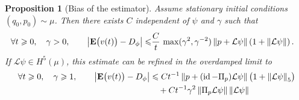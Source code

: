 \documentclass[11pt,a4paper]{article}
\DeclareMathOperator{\id}{id}
\newcommand{\expect}[0]{\mathbf{E}}
\theoremstyle{plain}
\newtheorem{proposition}{Proposition}[section]
\numberwithin{equation}{section}
\renewcommand{\leq}{\leqslant}
\renewcommand{\geq}{\geqslant}
\begin{document}
\begin{proposition}
    [Bias of the estimator]
    Assume stationary initial conditions~$(q_0, p_0) \sim \mu$.
    Then there exists $C$ independent of $\psi$ and $\gamma$ such that
    \begin{align}
        \label{eq:basic_bound_bias}
        \forall t \geq 0, \quad \gamma > 0, \qquad
        \abs{\expect \bigl( v(t) \bigr) - D_{\phi}}
        \leq &\frac{C}{t} \, \max(\gamma^2, \gamma^{-2}) \norm{p + \mathcal L\psi}  \left(1 + \norm{\mathcal L \psi} \right).
    \end{align}
    If $\mathcal L \psi \in H^5(\mu)$,
    this estimate can be refined in the overdamped limit to
    \begin{align*}
        \forall t \geq 0, \quad \gamma \geq 1, \qquad
        \abs{\expect \bigl( v(t) \bigr) - D_{\phi}}
        &\leq C t^{-1}
            \norm{p + (\id - \Pi_p) \mathcal L \psi} \bigl(1 + \norm{\mathcal L \psi}[5] \bigr) \\
             &\quad + C t^{-1} \gamma^2 \norm{\Pi_p \mathcal L \psi} \norm{\mathcal L \psi}
    \end{align*}
\end{proposition}
\end{document}
